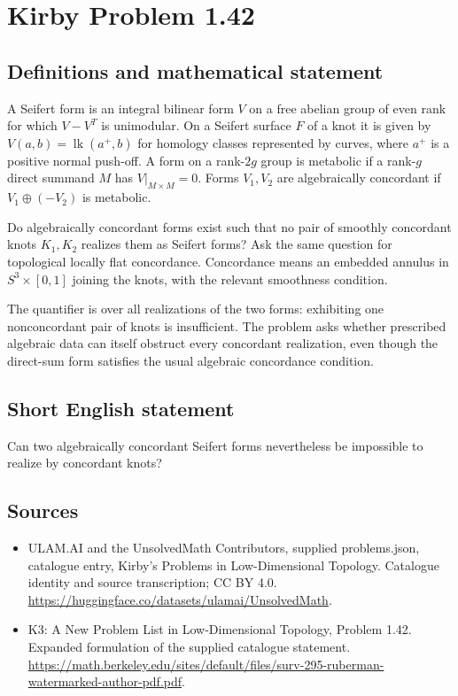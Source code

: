 \documentclass[11pt,a4paper]{article}
\begin{document}
\section*{Kirby Problem 1.42}\label{statement}

\subsection{Definitions and mathematical statement}
A Seifert form is an integral bilinear form $V$ on a free abelian group of even
rank for which $V-V^T$ is unimodular. On a Seifert surface $F$ of a knot it is
given by $V(a,b)=\operatorname{lk}(a^+,b)$ for homology classes represented by
curves, where $a^+$ is a positive normal push-off.
A form on a rank-$2g$ group is metabolic if a rank-$g$ direct summand $M$ has
$V|_{M\times M}=0$. Forms $V_1,V_2$ are algebraically concordant if
$V_1\oplus(-V_2)$ is metabolic.

Do algebraically concordant forms exist such that no pair of smoothly concordant
knots $K_1,K_2$ realizes them as Seifert forms? Ask the same question for
topological locally flat concordance. Concordance means an embedded annulus in
$S^3\times[0,1]$ joining the knots, with the relevant smoothness condition.

The quantifier is over all realizations of the two forms: exhibiting one
nonconcordant pair of knots is insufficient. The problem asks whether prescribed
algebraic data can itself obstruct every concordant realization, even though
the direct-sum form satisfies the usual algebraic concordance condition.
\subsection{Short English statement}
Can two algebraically concordant Seifert forms nevertheless be impossible to realize by concordant knots?
\subsection{Sources}
\begin{itemize}
\item[S1] ULAM.AI and the UnsolvedMath Contributors, supplied problems.json, catalogue entry, Kirby's Problems in Low-Dimensional Topology. Catalogue identity and source transcription; CC BY 4.0.
\url{https://huggingface.co/datasets/ulamai/UnsolvedMath}.
\item[S2] K3: A New Problem List in Low-Dimensional Topology, Problem 1.42. Expanded formulation of the supplied catalogue statement.
\url{https://math.berkeley.edu/sites/default/files/surv-295-ruberman-watermarked-author-pdf.pdf}.
\end{itemize}
\end{document}
